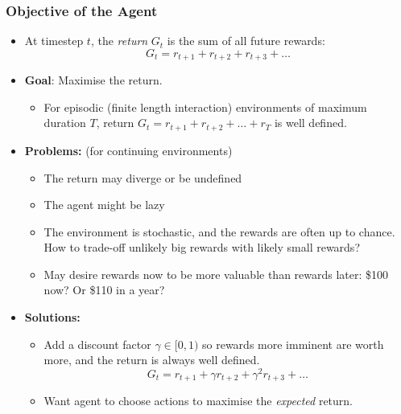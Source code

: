 \documentclass[10pt,a4paper]{beamer}
\begin{document}
\begin{frame}
	\frametitle{Objective of the Agent}
	
	\begin{itemize}
		\item At timestep $t$, the \textit{return} $G_t$ is the sum
		of all future rewards:
		$$
		G_t = r_{t+1} + r_{t+2} + r_{t+3} + \ldots 
		$$
		\pause
        \vspace{-0.6cm}
		\item \textbf{Goal}: Maximise the return.
		\pause
		\begin{itemize}
			\item For episodic  
			(finite length interaction) environments of maximum duration $T$,
			return $G_t = r_{t+1} + r_{t+2} + \ldots + r_T$ is well defined.   
		\end{itemize}
		\pause
		\item \textbf{Problems:} (for continuing environments)
		\begin{itemize}
			\item The return may diverge or be undefined
            \pause
			\item The agent might be lazy
            \pause
			\item The environment is stochastic, and the rewards are often
			up to chance. How to trade-off unlikely big rewards with
			likely small rewards?
            \pause
			\item May desire rewards now to be more valuable than rewards later:
			\$100 now? Or \$110 in a year?
		\end{itemize}
		\pause
		\item \textbf{Solutions:} 
		\begin{itemize}
			\item Add a discount factor $\gamma \in [0, 1)$
			so rewards more imminent are worth more, and the
			return is always well defined.
			$$
			G_t = r_{t+1} + \gamma r_{t+2} + \gamma^2 r_{t+3} + \ldots 
			$$
			\item Want agent to choose actions to
			maximise the \textit{expected} return.
		\end{itemize}
		
	\end{itemize}
\end{frame}
\end{document}
